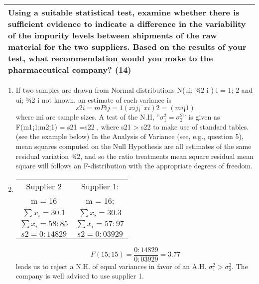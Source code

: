 \documentclass[a4paper,12pt]{article}
\begin{document}
\begin{table}[ht!]
\begin{tabular}{|p{15cm}|}
 
Using a suitable statistical test, examine whether there is sufficient evidence to indicate a difference in the variability of the impurity levels between shipments of the raw material for the two suppliers.  Based on the results of your test, what recommendation would you make to the pharmaceutical company? (14) 
\\ \hline
  
\end{tabular}

\end{table}


\begin{enumerate}
    \item If two samples are drawn from Normal distributions N(ui; ¾2
i ) i = 1; 2 and ui; ¾2
i not
known, an estimate of each variance is \[s2
i =
mPi
j=1
(xij ¡ ¯xi)2=(mi ¡1)\] where mi are sample
sizes. A test of the N.H, ”$\sigma^2_1 = \sigma^2_2 $” is given as F(m1¡1;m2¡1) = s21
=s22
, where s21
> s22
to
make use of standard tables. (see the example below)
In the Analysis of Variance (see, e.g., question 5), mean squares computed on the
Null Hypothesis are all estimates of the same residual variation ¾2, and so the ratio
treatments mean square
residual mean square will follows an F-distribution with the appropriate degrees of freedom.
\item 

\begin{center}
\begin{tabular}{c|c}
Supplier 2 &  Supplier 1: \\
m = 16 &  m = 16;\\
$\sum x_i = 30.1$ &  $\sum x_i = 30.3$ \\
$\sum x_i = 58:85$     & $\sum x_i =  57:97$ \\
$s2 = 0:14829$ & $s2 = 0:03929$ \\
\end{tabular}
\end{center}
\[ F(15;15) = \frac{0:14829}{0:03929} = 3.77\]
leads us to reject a N.H. of equal variances in favor of an A.H. $\sigma^2_1 > \sigma^2_2 $. The company is
well advised to use supplier 1.
\end{enumerate}
\end{document}
